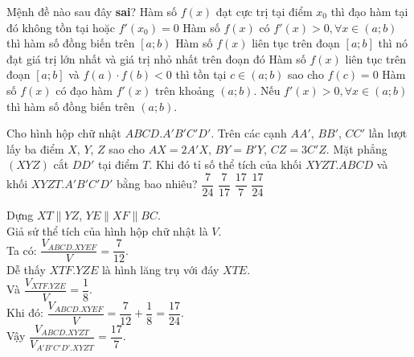 \begin{ex}%
 Mệnh đề nào sau đây \textbf{sai}?
 \choice
  {Hàm số $f(x)$ đạt cực trị tại điểm $x_0$ thì đạo hàm tại đó không tồn tại hoặc $f'(x_0) = 0$}
  {\True Hàm số $f(x)$ có $f'(x) > 0, \forall x \in (a;b)$ thì hàm số đồng biến trên $\left[a;b \right)$}
  {Hàm số $f(x)$ liên tục trên đoạn $[a;b]$ thì nó đạt giá trị lớn nhất và giá trị nhỏ nhất trên đoạn đó}
  {Hàm số $f(x)$ liên tục trên đoạn $[a;b]$ và $f(a) \cdot f(b) < 0$ thì tồn tại $c \in (a;b)$ sao cho $f(c) = 0$}
 \loigiai
  {
  Hàm số $f(x)$ có đạo hàm $f'(x)$ trên khoảng $\left(a; b\right)$. Nếu $f'(x) > 0, \forall x \in (a;b)$ thì hàm số đồng biến trên $\left(a;b \right)$.
  }
\end{ex}


\begin{ex}%
 Cho hình hộp chữ nhật $ABCD.A'B'C'D'$. Trên các cạnh $AA'$, $BB'$, $CC'$ lần lượt lấy ba điểm $X$, $Y$, $Z$ sao cho $AX = 2A'X$, $BY = B'Y$, $CZ = 3C'Z$. Mặt phẳng $(XYZ)$ cắt $DD'$ tại điểm $T$. Khi đó tỉ số thể tích của khối $XYZT.ABCD$ và khối $XYZT.A'B'C'D'$ bằng bao nhiêu?
 \choice
  {$\dfrac{7}{24}$}
  {$\dfrac{7}{17}$}
  {\True $\dfrac{17}{7}$}
  {$\dfrac{17}{24}$}
 \loigiai
  {
  \immini
  {
  Dựng $XT \parallel YZ$, $YE \parallel XF \parallel BC$.\\
  Giả sử thể tích của hình hộp chữ nhật là $V$.\\
  Ta có: $\dfrac{V_{ABCD.XYEF}}{V} = \dfrac{7}{12}$.\\
  Dễ thấy $XTF.YZE$ là hình lăng trụ với đáy $XTE$.\\
  Và $\dfrac{V_{XTF.YZE}}{V} = \dfrac{1}{8}$.\\
  Khi đó: $\dfrac{V_{ABCD.XYEF}}{V} = \dfrac{7}{12} + \dfrac{1}{8} = \dfrac{17}{24}$.\\
  Vậy $\dfrac{V_{ABCD.XYZT}}{V_{A'B'C'D'.XYZT}} = \dfrac{17}{7}$.
  }
  {
  }
  }
\end{ex}


